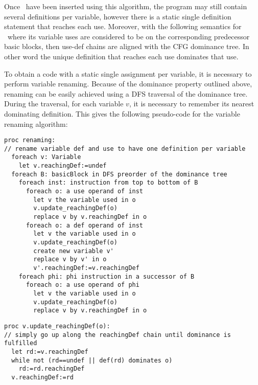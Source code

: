 Once \phiops\ have been inserted using this algorithm, the program may still contain several definitions per variable, however there is a static single definition statement that reaches each use. Moreover, with the following semantics for \phiops\ where its variable uses are considered to be on the corresponding predecessor basic blocks, then use-def chains are aligned with the CFG dominance tree. In other word the unique definition that reaches each use dominates that use.

To obtain a code with a static single assignment per variable, it is necessary to perform variable renaming. Because of the dominance property outlined above,
renaming can be easily achieved using a DFS traversal of the dominance tree.
During the traversal, for each variable $v$, it is necessary to remember its nearest dominating definition.
This gives the following pseudo-code for the variable renaming algorithm:
\begin{verbatim}
proc renaming:
// rename variable def and use to have one definition per variable
  foreach v: Variable
    let v.reachingDef:=undef
  foreach B: basicBlock in DFS preorder of the dominance tree
    foreach inst: instruction from top to bottom of B
      foreach o: a use operand of inst
        let v the variable used in o
        v.update_reachingDef(o)
        replace v by v.reachingDef in o
      foreach o: a def operand of inst
        let v the variable used in o
        v.update_reachingDef(o)
        create new variable v'
        replace v by v' in o
        v'.reachingDef:=v.reachingDef
    foreach phi: phi instruction in a successor of B
      foreach o: a use operand of phi
        let v the variable used in o
        v.update_reachingDef(o)
        replace v by v.reachingDef in o
\end{verbatim}

\begin{verbatim}
proc v.update_reachingDef(o):
// simply go up along the reachingDef chain until dominance is fulfilled 
  let rd:=v.reachingDef
  while not (rd==undef || def(rd) dominates o)
    rd:=rd.reachingDef
  v.reachingDef:=rd
\end{verbatim}

